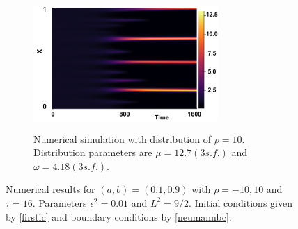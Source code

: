 \begin{figure}[H]
    \hfill
    \begin{subfigure}[t]{0.45\textwidth}
        \centering
        \includegraphics[width=7cm,height=5cm]{t1610.png}
        \caption{Numerical simulation with distribution of $\rho=10$. Distribution parameters are $\mu=12.7(3 s.f.)$ and $\omega=4.18(3 s.f.)$.}
        \label{}
    \end{subfigure}
    \caption{Numerical results for $(a,b)=(0.1,0.9)$ with $\rho=-10,10$ and $\tau=16$. Parameters $\epsilon^2=0.01$ and $L^2=9/2$. Initial conditions given by \eqref{firstic} and boundary conditions by \eqref{neumannbc}.}
    \label{fig:linskew3}
\end{figure}
